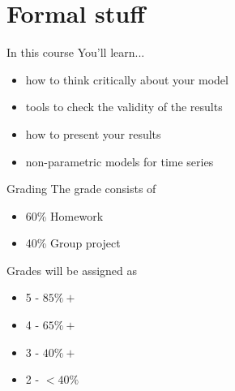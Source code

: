 \documentclass{beamer}
\begin{document}
\section{Formal stuff}
\begin{frame}{In this course}
You'll learn...
\begin{itemize}
    \item how to think critically about your model
    \item tools to check the validity of the results
    \item how to present your results
    \item non-parametric models for time series 
\end{itemize}
\end{frame}
\begin{frame}{Grading}
The grade consists of
    \begin{itemize}
        \item 60\% Homework
        \item 40\% Group project
    \end{itemize}
Grades will be assigned as
    \begin{itemize}
        \item 5 - $85\%+$
        \item 4 - $65\%+$
        \item 3 - $40\%+$
        \item 2 - $<40\%$
    \end{itemize}
\end{frame}
\end{document}
